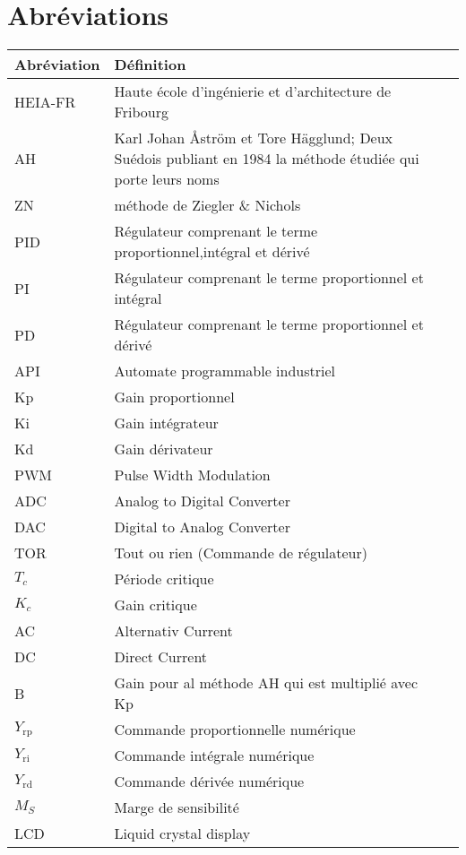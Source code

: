 \section*{Abréviations}
\begin{longtable}{p{2.5cm}p{10.4cm}p{0.1cm}}
    \toprule
    Abréviation & Définition \\
    \midrule\endhead 
	HEIA-FR	&	Haute école d'ingénierie et d'architecture de Fribourg	&\\
	AH & Karl Johan Åström et Tore Hägglund; Deux Suédois publiant en 1984 la méthode étudiée qui porte leurs noms &\\
	ZN &  méthode de Ziegler \& Nichols & \\
	PID & Régulateur comprenant le terme proportionnel,intégral et dérivé &\\
	PI & Régulateur comprenant le terme proportionnel et intégral &\\
	PD & Régulateur comprenant le terme proportionnel et dérivé &\\
	API & Automate programmable industriel &\\
	Kp & Gain proportionnel & \\
	Ki & Gain intégrateur & \\
	Kd & Gain dérivateur & \\
	PWM & Pulse Width Modulation & \\
	ADC & Analog to Digital Converter& \\
	DAC & Digital to Analog Converter& \\
	TOR & Tout ou rien (Commande de régulateur)& \\
	$T_c$ & Période critique& \\
	$K_c $& Gain critique& \\
	AC & Alternativ Current& \\
	DC & Direct Current& \\
	B & Gain pour al méthode AH qui est multiplié avec Kp& \\
	$Y_\text{rp}$ & Commande proportionnelle numérique & \\
	$Y_\text{ri}$ & Commande intégrale numérique & \\
	$Y_\text{rd}$ &Commande dérivée numérique & \\ 
	$M_S$& Marge de sensibilité& \\
	 LCD& Liquid crystal display& \\
	 
	\bottomrule
\end{longtable}


